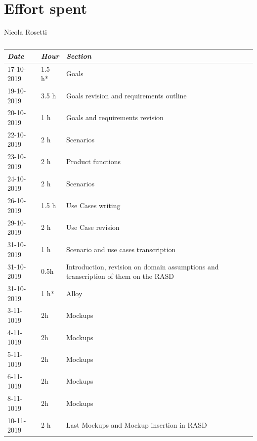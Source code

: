 \documentclass[a4paper]{report}
\begin{document}
\restoregeometry

\chapter{Effort spent}

\begin{table}[H]
\centering
Nicola Rosetti \\
\begin{tabular}{p{2cm}p{1.5cm}p{7cm}}
\toprule
\textit{Date} & \textit{Hour} & \textit{Section} \\ \midrule
17-10-2019 & 1.5 h* & Goals \\ \midrule
19-10-2019 & 3.5 h & Goals revision and requirements outline  \\ \midrule
20-10-2019 & 1 h & Goals and requirements revision \\ \midrule
22-10-2019 & 2 h & Scenarios \\ \midrule
23-10-2019 & 2 h & Product functions \\ \midrule
24-10-2019 & 2 h & Scenarios \\ \midrule
26-10-2019 & 1.5 h & Use Cases writing \\ \midrule
29-10-2019 & 2 h & Use Case revision\\ \midrule
31-10-2019 & 1 h & Scenario and use cases transcription \\ \midrule
31-10-2019 & 0.5h & Introduction, revision on domain assumptions and transcription of them on the RASD \\ \midrule
31-10-2019 & 1 h* & Alloy \\ \midrule
3-11-1019 & 2h & Mockups\\ \midrule
4-11-1019 & 2h & Mockups\\ \midrule
5-11-1019 & 2h & Mockups\\ \midrule
6-11-1019 & 2h & Mockups\\ \midrule
8-11-1019 & 2h & Mockups\\ \midrule
10-11-2019 & 2 h & Last Mockups and Mockup insertion in RASD \\
\bottomrule
\end{tabular}
\caption[Nicola Rosetti's effort table]{}
\end{table}
\end{document}
